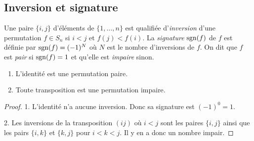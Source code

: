 \documentclass[french,course,oneside,theoremnosection]{lecture}
\begin{document}
\subsection{Inversion et signature}
\begin{definition}
Une paire $\{i,j\}$ d'éléments de $\{1,\ldots, n\}$ est qualifiée d'\emph{inversion} d'une permutation $f\in S_n$ si $i < j $ et $f(j) < f(i)$. La \emph{signature} $\operatorname{sgn}(f)$ de $f$ est définie par $\operatorname{sgn}(f)=(-1)^N$ où $N$ est le nombre d'inversions de $f$. On dit que $f$ est \emph{pair} si $\operatorname{sgn}(f)=1$ et qu'elle est \emph{impaire} sinon.
\end{definition}

\begin{lemma}{}
\begin{enumerate}
\item L'identité est une permutation paire.
\item Toute transposition est une permutation impaire.
\end{enumerate}
\end{lemma}
\begin{proof}
1. L'identité n'a aucune inversion. Donc sa signature est $(-1)^0=1$.

2. Les inversions de la transposition $(ij)$ où $i<j$ sont les paires $\{i,j\}$ ainsi que les pairs $\{i,k\}$ et $\{k,j\}$ pour $i < k < j$. Il y en a donc un nombre impair.
\end{proof}
\end{document}
